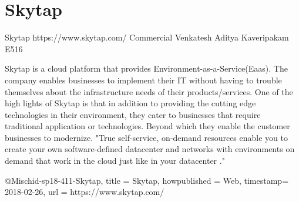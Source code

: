 \section{Skytap}

Skytap
https://www.skytap.com/
Commercial
Venkatesh Aditya Kaveripakam
E516

Skytap is a cloud platform that provides Environment-as-a-Service(Eaas). The
company enables businesses to implement their IT without having to
trouble themselves about the infrastructure needs of their products/services.
One of the high lights of Skytap is that in addition to providing the
cutting edge technologies in their environment, they cater to businesses that
require traditional application or technologies. Beyond which they enable the
customer businesses to modernize. "True self-service, on-demand resources
enable you to create your own software-defined datacenter and networks with
environments on demand that work in the cloud just like in your datacenter
."\cite{hid-sp18-411-Skytap}

@Misc{hid-sp18-411-Skytap,
title = {Skytap},
howpublished = {Web},
timestamp= {2018-02-26},
url = {https://www.skytap.com/}
}